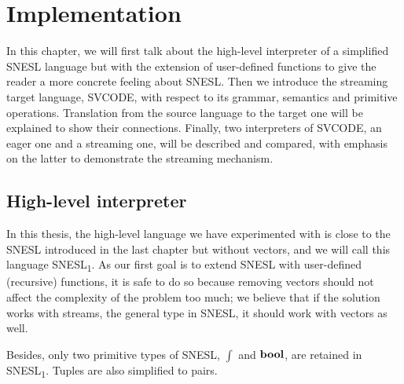 
\newcommand\tr{\triangleright}
\newcommand{\proc}{\*{Proc}}
\newcommand{\bufst}{\*{BufState}}
\newcommand{\sups}{\*{Sups}}
\newcommand{\clis}{\*{Clis}}
\newcommand{\xducer}{\*{Xducer}}
\newcommand{\filling}{\texttt{Filling}}
\newcommand{\draining}{\texttt{Draining}}
\newcommand{\pin}{\texttt{Pin}}
\newcommand{\pout}{\texttt{Pout}}
\newcommand{\done}{\texttt{Done}}

\newcommand{\ftype}{\varphi}

\newcommand\mysnesl{SNESL\textsubscript{1}}

\def\interT#1#2#3{\vdash_{#1} #2 : #3}
\def\conc#1{#1 \ {\mathbf{concrete}}}

\chapter{Implementation}

\def\Type#1#2#3{#1 \vdash_{\Sigma} \ #2 : #3 } 
\def\Eval#1#2#3{#1 \vdash_{\Phi} #2 \Eva #3 } 

In this chapter, we will first talk about the high-level interpreter of a simplified SNESL language but with the extension of user-defined functions to give the reader a more concrete feeling about SNESL. 
Then we introduce the streaming target language, SVCODE, with respect to its grammar, semantics and primitive operations.
Translation from the source language to the target one will be explained to show their connections.
Finally, two interpreters of SVCODE, an eager one and a streaming one, will be described and compared, with emphasis on the latter to demonstrate the streaming mechanism.



\section{High-level interpreter}


In this thesis, the high-level language we have experimented with is close to the SNESL introduced in the last chapter but without vectors, and we will call this language \mysnesl.
As our first goal is to extend SNESL with user-defined (recursive) functions,
it is safe to do so because removing vectors should not affect the complexity of the problem too much; we believe that if the solution works with streams, the general type in SNESL, it should work with vectors as well. 

Besides, only two primitive types of SNESL, $\int$ and $\mathbf{bool}$, are retained in \mysnesl. 
Tuples are also simplified to pairs.  

